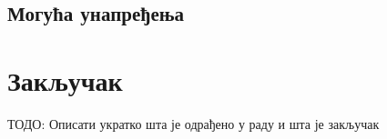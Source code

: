 \documentclass[12pt,oneside]{memoir}
\begin{document}
\section{Могућа унапређења}



\chapter{Закључак}
ТОДО: Описати укратко шта је одрађено у раду и шта је закључак


\literatura

\backmatter

\begin{biografija}
\end{biografija}
\end{document}
